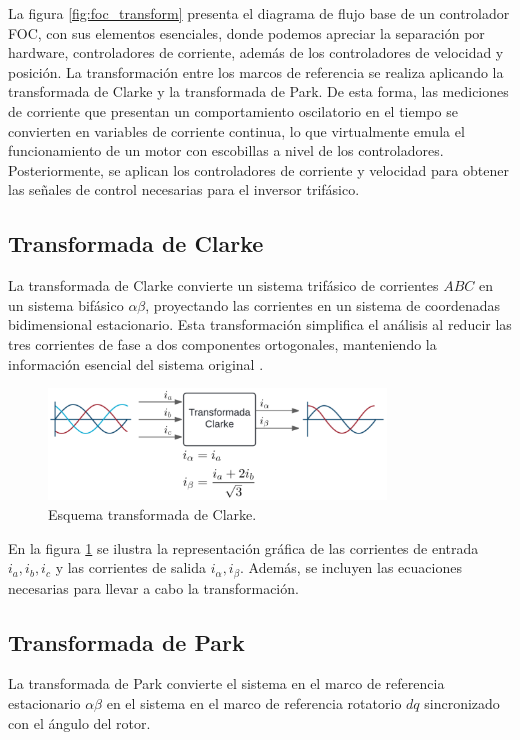 \documentclass[11pt]{report}
\begin{document}
La figura \ref{fig:foc_transform} presenta el diagrama de flujo base de un controlador FOC, con sus elementos esenciales, donde podemos apreciar la separación por hardware, controladores de corriente, además de los controladores de velocidad y posición. La transformación entre los marcos de referencia se realiza aplicando la transformada de Clarke y la transformada de Park. De esta forma, las mediciones de corriente que presentan un comportamiento oscilatorio en el tiempo se convierten en variables de corriente continua, lo que virtualmente emula el funcionamiento de un motor con escobillas a nivel de los controladores\cite{power_conv_14}. Posteriormente, se aplican los controladores de corriente y velocidad para obtener las señales de control necesarias para el inversor trifásico.

\newpage
\subsection{Transformada de Clarke}
La transformada de Clarke convierte un sistema trifásico de corrientes \(ABC\) en un sistema bifásico \(\alpha\beta\), proyectando las corrientes en un sistema de coordenadas bidimensional estacionario. Esta transformación simplifica el análisis al reducir las tres corrientes de fase a dos componentes ortogonales, manteniendo la información esencial del sistema original \cite{AN1078}.

\begin{figure}[ht]
	\centering
	\includegraphics[width=0.8\textwidth]{imagenes/Diagramas/clarke.png}
	\caption{Esquema transformada de Clarke.}
	\label{fig:clarke_transform}
\end{figure}
\FloatBarrier

En la figura \ref{fig:clarke_transform} se ilustra la representación gráfica de las corrientes de entrada \(i_a, i_b, i_c\) y las corrientes de salida \(i_\alpha, i_\beta\). Además, se incluyen las ecuaciones necesarias para llevar a cabo la transformación.

\subsection{Transformada de Park}
La transformada de Park convierte el sistema en el marco de referencia estacionario \(\alpha\beta\) en el sistema en el marco de referencia rotatorio \(dq\) sincronizado con el ángulo del rotor\cite{AN1078}.
\end{document}
